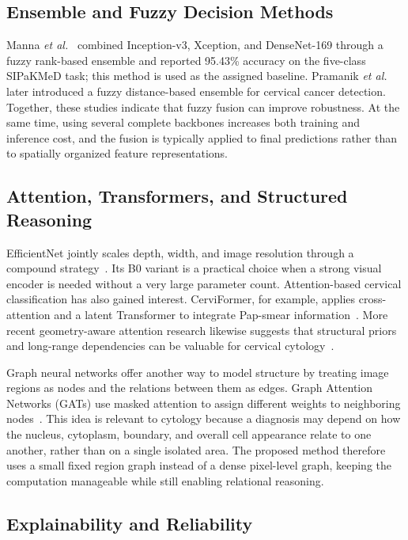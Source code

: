 \documentclass[10pt,conference]{IEEEtran}
\begin{document}
\subsection{Ensemble and Fuzzy Decision Methods}

Manna \emph{et al.}~\cite{manna2021} combined Inception-v3, Xception, and DenseNet-169 through a fuzzy rank-based ensemble and reported 95.43\% accuracy on the five-class SIPaKMeD task; this method is used as the assigned baseline. Pramanik \emph{et al.}~\cite{pramanik2022fuzzy} later introduced a fuzzy distance-based ensemble for cervical cancer detection. Together, these studies indicate that fuzzy fusion can improve robustness. At the same time, using several complete backbones increases both training and inference cost, and the fusion is typically applied to final predictions rather than to spatially organized feature representations.

\subsection{Attention, Transformers, and Structured Reasoning}

EfficientNet jointly scales depth, width, and image resolution through a compound strategy~\cite{tan2019efficientnet}. Its B0 variant is a practical choice when a strong visual encoder is needed without a very large parameter count. Attention-based cervical classification has also gained interest. CerviFormer, for example, applies cross-attention and a latent Transformer to integrate Pap-smear information~\cite{deo2024cerviformer}. More recent geometry-aware attention research likewise suggests that structural priors and long-range dependencies can be valuable for cervical cytology~\cite{li2026geometry}.

Graph neural networks offer another way to model structure by treating image regions as nodes and the relations between them as edges. Graph Attention Networks (GATs) use masked attention to assign different weights to neighboring nodes~\cite{velickovic2018gat}. This idea is relevant to cytology because a diagnosis may depend on how the nucleus, cytoplasm, boundary, and overall cell appearance relate to one another, rather than on a single isolated area. The proposed method therefore uses a small fixed region graph instead of a dense pixel-level graph, keeping the computation manageable while still enabling relational reasoning.

\subsection{Explainability and Reliability}
\end{document}
